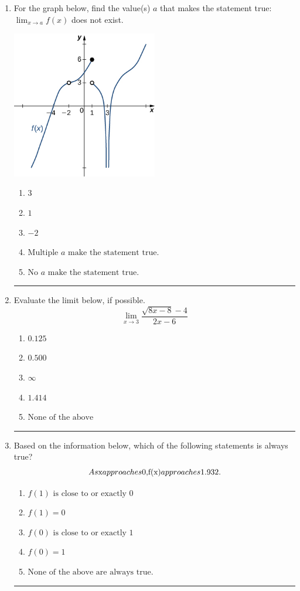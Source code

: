 \documentclass[14pt]{extbook}
\newcommand{\litem}[1]{\item#1\hspace*{-1cm}\rule{\textwidth}{0.4pt}}
\begin{document}
\begin{enumerate}
{\begin{enumerate}[label=\Alph*.]
\end{enumerate} }
\litem{
For the graph below, find the value(s) $a$ that makes the statement true: $ \displaystyle \lim_{x \rightarrow a} f(x)$ does not exist.
\begin{center}
    \includegraphics[width=0.5\textwidth]{../Figures/evaluateLimitGraphicallyB.png}
\end{center}
\begin{enumerate}[label=\Alph*.]
\item \( 3 \)
\item \( 1 \)
\item \( -2 \)
\item \( \text{Multiple } a \text{ make the statement true}. \)
\item \( \text{No } a \text{ make the statement true}. \)

\end{enumerate} }
\litem{
Evaluate the limit below, if possible.\[ \lim_{x \rightarrow 3} \frac{\sqrt{8x - 8} - 4}{2x - 6} \]\begin{enumerate}[label=\Alph*.]
\item \( 0.125 \)
\item \( 0.500 \)
\item \( \infty \)
\item \( 1.414 \)
\item \( \text{None of the above} \)

\end{enumerate} }
\litem{
Based on the information below, which of the following statements is always true?\[ As $x$ approaches $0$, $f(x)$ approaches $1.932$. \]\begin{enumerate}[label=\Alph*.]
\item \( f(1) \text{ is close to or exactly } 0 \)
\item \( f(1) = 0 \)
\item \( f(0) \text{ is close to or exactly } 1 \)
\item \( f(0) = 1 \)
\item \( \text{None of the above are always true.} \)

\end{enumerate} }
\end{enumerate}
\end{document}
